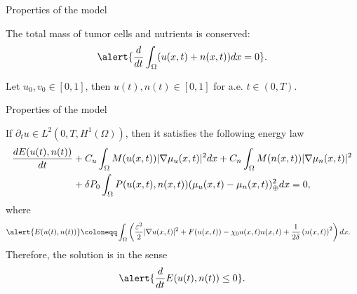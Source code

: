 \begin{frame}{Properties of the model}
	\begin{proposition}
		The total mass of tumor cells and nutrients is conserved: $$\alert{\frac{d}{dt}\int_\Omega (u(x,t)+n(x,t))dx=0}.$$
	\end{proposition}
	\vspace*{0.6cm}
	\begin{proposition}
		Let $u_0,v_0\in[0,1]$, then \alert{$u(t),n(t)\in[0,1]$} for a.e. $t\in(0,T)$.
	\end{proposition}
\end{frame}
\begin{frame}{Properties of the model}
	\scriptsize
	\begin{proposition}
		If $\partial_t u\in L^2(0,T, H^1(\Omega))$, then it satisfies the following energy law
		\begin{align*}
			\frac{d E(u(t),n(t))}{dt}&+C_u\int_\Omega M(u(x,t))|\nabla\mu_u(x,t)|^2dx+C_n\int_\Omega M(n(x,t))|\nabla\mu_n(x,t)|^2\notag\\&+\delta P_0\int_\Omega P(u(x,t),n(x,t))(\mu_u(x,t)-\mu_n(x,t))_\oplus ^2dx=0,
		\end{align*}
		where
		\begin{align*}
			\alert{E(u(t),n(t))}&\coloneqq\int_\Omega\left(\frac{\varepsilon^2}{2}|\nabla u(x,t)|^2+ F(u(x,t))-\chi_0u(x,t)n(x,t)+\frac{1}{2\delta}\left(n(x,t)\right)^2\right)dx.
		\end{align*}
		Therefore, the solution is  in the sense $$\alert{\frac{d}{dt}E(u(t),n(t))\le 0}.$$
	\end{proposition}
\end{frame}

